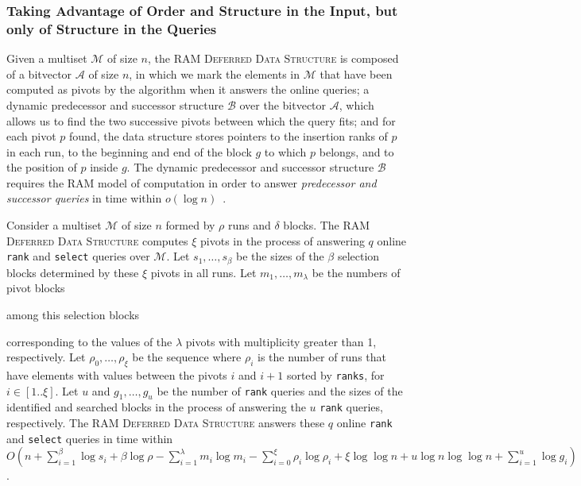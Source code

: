 \subsubsection{Taking Advantage of  Order and Structure in the Input, but only of Structure in the Queries}

Given a multiset $\mathcal{M}$ of size $n$, the \textsc{RAM Deferred
  Data Structure} is composed of a bitvector $\mathcal{A}$ of size
$n$, in which we mark the elements in $\mathcal{M}$ that have been
computed as pivots by the algorithm when it answers the online
queries; a dynamic predecessor and successor structure $\mathcal{B}$
over the bitvector $\mathcal{A}$, which allows us to find the two
successive pivots between which the query fits; and for each pivot $p$
found, the data structure stores pointers to the insertion ranks of
$p$ in each run, to the beginning and end of the block $g$ to which
$p$ belongs, and to the position of $p$ inside $g$. The dynamic
predecessor and successor structure $\mathcal{B}$ requires the RAM
model of computation in order to answer \emph{predecessor and
  successor queries} in time within
$o(\log{n})$~\cite{2002-JCSS-OptimalBoundsForThePredecessorProblemAndRelatedProblems-BeameFich}.

\begin{theorem}\label{theo:online-ram}
  Consider a multiset $\mathcal{M}$ of size $n$ formed by $\rho$ runs and
  $\delta$ blocks. The \textsc{RAM Deferred Data Structure} computes
  $\xi$ pivots in the process of answering $q$ online \texttt{rank}
  and \texttt{select} queries over $\mathcal{M}$. Let
  $s_1, \dots, s_{\beta}$ be the sizes of the $\beta$ selection
  blocks determined by these $\xi$ pivots in all runs. Let
  $m_1, \dots, m_\lambda$ be the numbers of pivot blocks
  \begin{LONG}
    among this selection blocks
  \end{LONG}
  corresponding to the values of the $\lambda$ pivots with
  multiplicity greater than 1, respectively.  Let
  $\rho_0, \dots, \rho_\xi$ be the sequence where $\rho_i$ is the
  number of runs that have elements with values between the pivots $i$
  and $i+1$ sorted by \texttt{ranks}, for $i\in[1..\xi]$.  Let $u$ and
  $g_1, \dots, g_u $ be the number of \texttt{rank} queries and the
  sizes of the identified and searched blocks in the process of
  answering the $u$ \texttt{rank} queries, respectively. The
  \textsc{RAM Deferred Data Structure} answers these $q$ online
  \texttt{rank} and \texttt{select} queries in time within
  $O(n + \sum^{\beta}_{i=1}\log{s_i} + \beta\log{\rho} -
  \sum^{\lambda}_{i=1}m_i\log{m_i}
  - \sum^{\xi}_{i=0}\rho_i\log{\rho_i} + \xi\log\log{n} +
  u\log{n}\log\log{n} + \sum^{u}_{i=1}\log{g_i})$.
\end{theorem}

